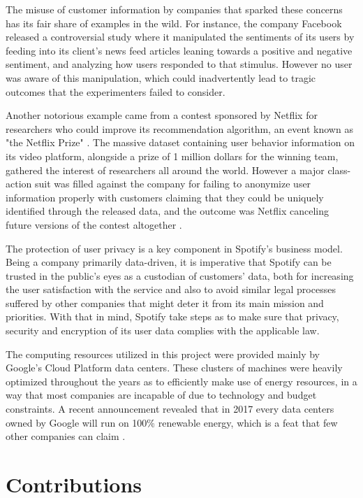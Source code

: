 \documentclass{kththesis}
\begin{document}
The misuse of customer information by companies that sparked these concerns has its fair share of examples in the wild. For instance, the company Facebook released a controversial study where it manipulated the sentiments of its users by feeding into its client's news feed articles leaning towards a positive and negative sentiment, and analyzing how users responded to that stimulus\citep{kramer2014experimental}. However no user was aware of this manipulation, which could inadvertently lead to tragic outcomes that the experimenters failed to consider. 

Another notorious example came from a contest sponsored by Netflix for researchers who could improve its recommendation algorithm, an event known as "the Netflix Prize" \citep{bennett2007netflix}. The massive dataset containing user behavior information on its video platform, alongside a prize of 1 million dollars for the winning team, gathered the interest of researchers all around the world. However a major class-action suit was filled against the company for failing to anonymize user information properly with customers claiming that they could be uniquely identified through the released data, and the outcome was Netflix canceling future versions of the contest altogether \citep{wired2010netflix}.

The protection of user privacy is a key component in Spotify's business model. Being a company primarily data-driven, it is imperative that Spotify can be trusted in the public's eyes as a custodian of customers' data, both for increasing the user satisfaction with the service and also to avoid similar legal processes suffered by other companies that might deter it from its main mission and priorities. With that in mind, Spotify take steps as to make sure that privacy, security and encryption of its user data complies with the applicable law. 

The computing resources utilized in this project were provided mainly by Google's Cloud Platform data centers. These clusters of machines were heavily optimized throughout the years as to efficiently make use of energy resources, in a way that most companies are incapable of due to technology and budget constraints. A recent announcement revealed that in 2017 every data centers owned by Google will run on 100\% renewable energy, which is a feat that few other companies can claim \citep{google2017renew}.  

\section{Contributions}
\end{document}
